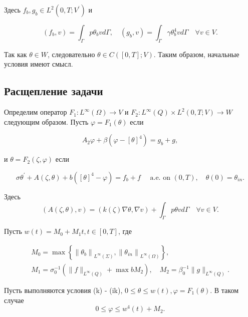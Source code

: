 Здесь $f_{b}, g_{b} \in L^{2}\left(0, T ; V^{\prime}\right)$ и

\[
    \left(f_{b}, v\right)=\int_{\Gamma} p \theta_{b} v d \Gamma,
    \quad\left(g_{b}, v\right)=
    \int_{\Gamma} \gamma \theta_{b}^{4} v d \Gamma \quad \forall v \in V.
\]

\begin{remark}
    Так как $\theta \in W$, следовательно $\theta \in C([0, T] ; V)$.
    Таким образом, начальные условия имеют смысл.
\end{remark}

\subsection{Расщепление задачи}
\label{subsec:ch1/sec5/subsec2}

Определим оператор $F_{1}: L^{\infty}(\Omega) \rightarrow V$ и
$F_{2}: L^{\infty}(Q) \times L^{2}(0, T ; V) \rightarrow W$ следующим образом.
Пусть $\varphi=F_{1}(\theta)$ если

\begin{equation}
    \label{eq:1_6:6}
    A_{2} \varphi+\beta\left(\varphi-[\theta]^{4}\right)=g_{b}+g,
\end{equation}

и $\theta=F_{2}(\zeta, \varphi)$ если

\begin{equation}
    \label{eq:1_6:7}
    \sigma \theta^{\prime}+A(\zeta, \theta)
    +b\left([\theta]^{4}-\varphi\right)=f_{b}+f
    \quad \text { a.e. on }(0, T), \quad \theta(0)=\theta_{i n}.
\end{equation}

Здесь
\[
    (A(\zeta, \theta), v)=(k(\zeta) \nabla \theta, \nabla v)
    +\int_{\Gamma} p \theta v d \Gamma \quad \forall v \in V.
\]

Пусть $w(t)=M_{0}+M_{1} t, t \in[0, T]$, где

\[
    \begin{gathered}
        M_{0}=\max \left\{\left\|\theta_{b}\right\|_{L^{\infty}(\Sigma)},
        \left\|\theta_{i n}\right\|_{L^{\infty}(\Omega)}\right\}, \\
        M_{1}=\sigma_{0}^{-1}\left(\|f\|_{L^{\infty}(Q)}+\max b M_{2}\right),
        \quad M_{2}=\beta_{0}^{-1}\|g\|_{L^{\infty}(Q)}.
    \end{gathered}
\]

\begin{lemma}
    \label{lm:1_6:1}
    Пусть выполняются условия (k) - (ik), $0 \leq \theta \leq w(t), \varphi=F_{1}(\theta)$.
    В таком случае
    \begin{equation}
        \label{eq:1_6:8}
        0 \leq \varphi \leq w^{4}(t)+M_2.
    \end{equation}
\end{lemma}

